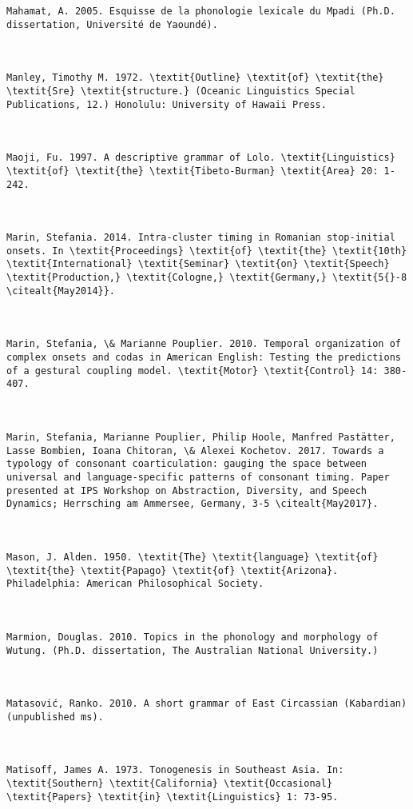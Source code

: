 \begin{verbatim}
Mahamat, A. 2005. Esquisse de la phonologie lexicale du Mpadi (Ph.D. dissertation, Université de Yaoundé).



Manley, Timothy M. 1972. \textit{Outline} \textit{of} \textit{the} \textit{Sre} \textit{structure.} (Oceanic Linguistics Special Publications, 12.) Honolulu: University of Hawaii Press.



Maoji, Fu. 1997. A descriptive grammar of Lolo. \textit{Linguistics} \textit{of} \textit{the} \textit{Tibeto-Burman} \textit{Area} 20: 1-242.



Marin, Stefania. 2014. Intra-cluster timing in Romanian stop-initial onsets. In \textit{Proceedings} \textit{of} \textit{the} \textit{10th} \textit{International} \textit{Seminar} \textit{on} \textit{Speech} \textit{Production,} \textit{Cologne,} \textit{Germany,} \textit{5{}-8 \citealt{May2014}}.



Marin, Stefania, \& Marianne Pouplier. 2010. Temporal organization of complex onsets and codas in American English: Testing the predictions of a gestural coupling model. \textit{Motor} \textit{Control} 14: 380-407.



Marin, Stefania, Marianne Pouplier, Philip Hoole, Manfred Pastätter, Lasse Bombien, Ioana Chitoran, \& Alexei Kochetov. 2017. Towards a typology of consonant coarticulation: gauging the space between universal and language-specific patterns of consonant timing. Paper presented at IPS Workshop on Abstraction, Diversity, and Speech Dynamics; Herrsching am Ammersee, Germany, 3-5 \citealt{May2017}.



Mason, J. Alden. 1950. \textit{The} \textit{language} \textit{of} \textit{the} \textit{Papago} \textit{of} \textit{Arizona}. Philadelphia: American Philosophical Society.



Marmion, Douglas. 2010. Topics in the phonology and morphology of Wutung. (Ph.D. dissertation, The Australian National University.)



Matasović, Ranko. 2010. A short grammar of East Circassian (Kabardian) (unpublished ms).



Matisoff, James A. 1973. Tonogenesis in Southeast Asia. In: \textit{Southern} \textit{California} \textit{Occasional} \textit{Papers} \textit{in} \textit{Linguistics} 1: 73-95.




\end{verbatim}
